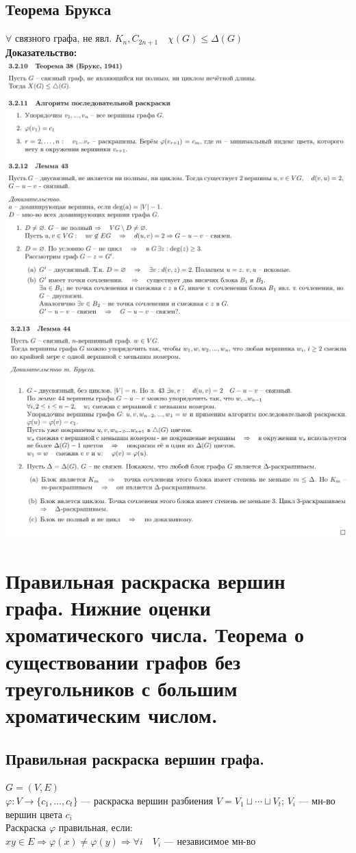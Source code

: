\documentclass[12pt]{article}
\begin{document}
\subsection{Теорема Брукса}
	$\forall$ связного графа, не явл. $K_n, C_{2n + 1} \quad \chi(G) \leqslant \Delta(G)$\\
	\textbf{Доказательство:}\\
		\includegraphics[width=600pt]{9}\\
		\includegraphics[width=600pt]{10}
	\qedsymbol

\section{Правильная раскраска вершин графа. Нижние оценки хроматического числа. Теорема о существовании графов без треугольников с большим хроматическим числом.}
\subsection{Правильная раскраска вершин графа.}
	$G = (V,E)$\\
	$\varphi:V \to \{c_1,\dotsc,c_t\}$ — раскраска вершин разбиения $V = V_1 \sqcup \dotsb \sqcup V_t$; $V_i$ — мн-во вершин цвета $c_i$\\
	Раскраска $\varphi$ правильная, если:\\
	$xy \in E \Rightarrow \varphi(x) \neq \varphi(y) \Rightarrow \forall i \quad V_i$ — независимое мн-во
\end{document}

